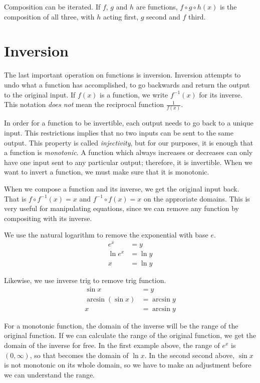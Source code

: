 \documentclass[fleqn]{report}
\begin{document}
Composition can be iterated. If $f$, $g$ and $h$ are
functions, $f \circ g \circ h(x)$ is the composition of all
three, with $h$ acting first, $g$ second and $f$ third. 

\section*{Inversion}

The last important operation on functions is inversion.
Inversion attempts to undo what a function has accomplished,
to go backwards and return the output to the original input.
If $f(x)$ is a function, we write $f^{-1}(x)$ for its inverse.
This notation \emph{does not} mean the reciprocal function
$\frac{1}{f(x)}$. 

In order for a function to be invertible, each output needs to
go back to a unique input. This restrictions implies that  no
two inputs can be sent to the same output. This property is
called \emph{injectivity}, but for our purposes, it is enough
that a function is \emph{monotonic}. A function which always
increases or decreases can only have one input sent to any
particular output; therefore, it is invertible.  When we want
to invert a function, we must make sure that it is monotonic.

When we compose a function and its inverse, we get the
original input back. That is $f \circ f^{-1}(x) = x$ and
$f^{-1} \circ f(x) = x$ on the approriate domains. This is
very useful for manipulating equations, since we can remove
any function by compositing with its inverse. 

\begin{example}
We use the natural logarithm to remove the exponential with
base $e$.
\begin{align*}
e^x & = y \\
\ln e^x & = \ln y \\
x & = \ln y
\end{align*}
\end{example}

\begin{example}
Likewise, we use inverse trig to remove trig function.
\begin{align*}
\sin x & = y \\
\arcsin (\sin x) &= \arcsin y \\
x & = \arcsin y
\end{align*}
\end{example}

For a monotonic function, the domain of the inverse will be
the range of the original function. If we can calculate the
range of the original function, we get the domain of the
inverse for free. In the first example above, the range of
$e^x$ is $(0,\infty)$, so that becomes the domain of $\ln x$.
In the second second above, $\sin x$ is not monotonic on its
whole domain, so we have to make an adjustment before we can
understand the range. 
\clearpage
\end{document}
